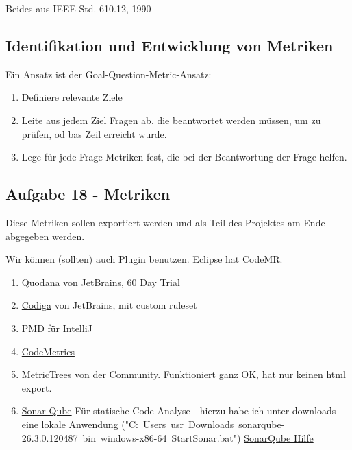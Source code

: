 \documentclass[a4paper]{article}
\begin{document}
Beides aus IEEE Std. 610.12, 1990


\subsection{Identifikation und Entwicklung von Metriken}

Ein Ansatz ist der Goal-Question-Metric-Ansatz:

\begin{enumerate}
    \item Definiere relevante Ziele
    \item Leite aus jedem Ziel Fragen ab, die beantwortet werden müssen, um zu prüfen, od bas Zeil erreicht wurde.
    \item Lege für jede Frage Metriken fest, die bei der Beantwortung der Frage helfen.
\end{enumerate}

\subsection{Aufgabe 18 - Metriken}

Diese Metriken sollen exportiert werden und als Teil des Projektes am Ende abgegeben werden.

Wir können (sollten) auch Plugin benutzen. Eclipse hat CodeMR.

\begin{enumerate}
    \item \href{https://www.jetbrains.com/qodana/}{Quodana} von JetBrains, 60 Day Trial
    \item \href{https://www.codiga.io/static-code-analysis/jetbrains/}{Codiga} von JetBrains, mit custom ruleset
    \item \href{https://plugins.jetbrains.com/plugin/1137-pmd}{PMD} für IntelliJ
    \item \href{https://plugins.jetbrains.com/plugin/12159-codemetrics}{CodeMetrics}
    \item MetricTrees von der Community. Funktioniert ganz OK, hat nur keinen html export.
    \item \href{https://www.sonarsource.com/products/sonarqube/}{Sonar Qube} Für statische Code Analyse - hierzu habe ich unter downloads eine lokale Anwendung ("C:\ Users\ usr\ Downloads\ sonarqube-26.3.0.120487\ bin\ windows-x86-64\ StartSonar.bat") \href{https://docs.sonarsource.com/sonarqube-server/try-out-sonarqube}{SonarQube Hilfe}
\end{enumerate}
\end{document}
